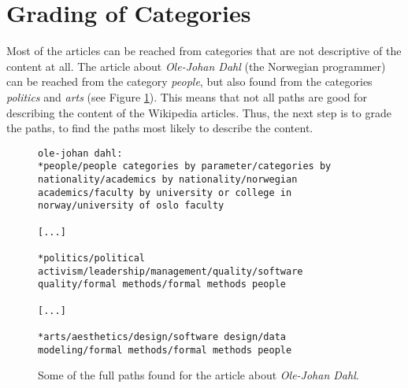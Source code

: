 \section{Grading of Categories}
\label{sec:grading_of_categories}

Most of the articles can be reached from categories that are not descriptive of the content at all. The article about \emph{Ole-Johan Dahl} (the Norwegian programmer) can be reached from the category \emph{people}, but also found from the categories \emph{politics} and \emph{arts} (see Figure \ref{fig:olejohandahl_paths}). This means that not all paths are good for describing the content of the Wikipedia articles. Thus, the next step is to grade the paths, to find the paths most likely to describe the content.


\begin{figure}[h]
\centering
\begin{lstlisting}
ole-johan dahl:
*people/people categories by parameter/categories by nationality/academics by nationality/norwegian academics/faculty by university or college in norway/university of oslo faculty

[...]

*politics/political activism/leadership/management/quality/software quality/formal methods/formal methods people

[...]

*arts/aesthetics/design/software design/data modeling/formal methods/formal methods people

\end{lstlisting}
\caption[Example of variety in article paths]{Some of the full paths found for the article about \emph{Ole-Johan Dahl}.}
\label{fig:olejohandahl_paths}
\end{figure}

